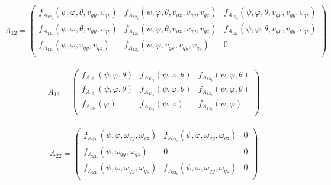 \begin{equation}
A_{12}=\left(\begin{array}{ccc}
f_{A_{12_1}}(\psi,\varphi,\theta,v_{qy},v_{qz}) & f_{A_{12_2}}(\psi,\varphi,\theta,v_{qx},v_{qy},v_{qz}) &  f_{A_{12_3}}(\psi,\varphi,\theta,v_{qx},v_{qy},v_{qz}) \\
f_{A_{12_4}}(\psi,\varphi,\theta,v_{qy},v_{qz}) & f_{A_{12_5}}(\psi,\varphi,\theta,v_{qx},v_{qy},v_{qz}) & f_{A_{12_6}}(\psi,\varphi,\theta,v_{qx},v_{qy},v_{qz}) \\
f_{A_{12_7}}(\psi,\varphi,v_{qy},v_{qz})&                                                        f_{A_{12_8}}(\psi,\varphi,v_{qx},v_{qy},v_{qz})&                                                                                                                                                 0\\
\end{array}\right)
\end{equation}\\

\begin{equation}
A_{13}=\left(\begin{array}{ccc}
f_{A_{13_1}}(\psi,\varphi,\theta) & f_{A_{13_2}}(\psi,\varphi,\theta) &  f_{A_{13_3}}(\psi,\varphi,\theta) \\
f_{A_{13_4}}(\psi,\varphi,\theta) & f_{A_{13_5}}(\psi,\varphi,\theta) & f_{A_{13_6}}(\psi,\varphi,\theta) \\
f_{A_{13_7}}(\varphi)& f_{A_{13_8}}(\psi,\varphi)&                                                                                                                                                 f_{A_{13_8}}(\psi,\varphi)\\
\end{array}\right)
\end{equation}\\

\begin{equation}
A_{22}=\left(\begin{array}{ccc}
f_{A_{22_1}}(\psi,\varphi,\omega_{qy},\omega_{qz}) & f_{A_{22_2}}(\psi,\varphi,\omega_{qy},\omega_{qz}) &  0 \\
f_{A_{22_4}}(\psi,\omega_{qy},\omega_{qz}) & 0 & 0 \\
f_{A_{22_7}}(\psi,\varphi,\omega_{qy},\omega_{qz})&                                                        f_{A_{22_8}}(\psi,\varphi,\omega_{qy},\omega_{qz})&                                                                                                                                                 0\\
\end{array}\right)
\end{equation}\\

